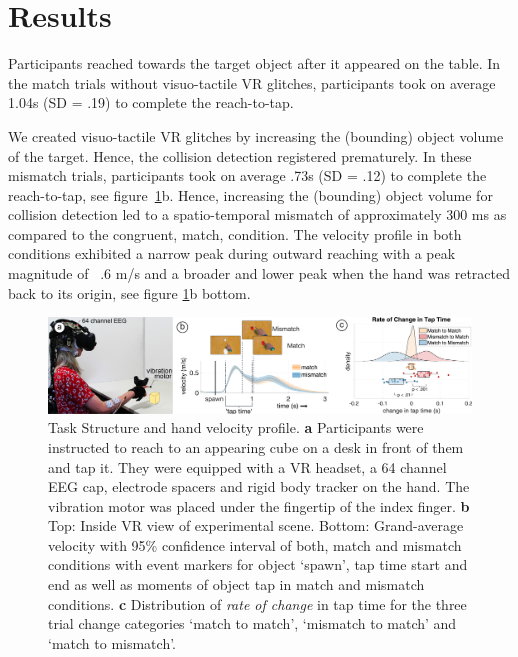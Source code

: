
\section{Results}

Participants reached towards the target object after it appeared on the table. In the match trials without visuo-tactile VR glitches, participants took on average 1.04s (SD = .19) to complete the reach-to-tap. 


We created visuo-tactile VR glitches by increasing the (bounding) object volume of the target. Hence, the collision detection registered prematurely. In these mismatch trials, participants took on average .73s (SD = .12) to complete the reach-to-tap, see figure~\ref{setup_and_behavior}b. Hence, increasing the (bounding) object volume for collision detection led to a spatio-temporal mismatch of approximately 300 ms as compared to the congruent, match, condition. The velocity profile in both conditions exhibited a narrow peak during outward reaching with a peak magnitude of ~.6 m/s and a broader and lower peak when the hand was retracted back to its origin, see figure \ref{setup_and_behavior}b bottom.

\begin{figure}[!h]
  \includegraphics[width=\textwidth]{figures/task_behavior_new.pdf}
  \caption{Task Structure and hand velocity profile. \textbf{a} Participants were instructed to reach to an appearing cube on a desk in front of them and tap it. They were equipped with a VR headset, a 64 channel EEG cap, electrode spacers and rigid body tracker on the hand. The vibration motor was placed under the fingertip of the index finger. \textbf{b} Top: Inside VR view of experimental scene. Bottom: Grand-average velocity with 95\% confidence interval of both, match and mismatch conditions with event markers for object `spawn', tap time start and end as well as moments of object tap in match and mismatch conditions. \textbf{c} Distribution of \textit{rate of change} in tap time for the three trial change categories `match to match', `mismatch to match' and `match to mismatch'.}
  \label{setup_and_behavior}
\end{figure}

